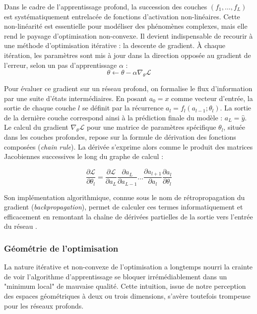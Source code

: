 Dans le cadre de l'apprentissage profond, la succession des couches $(f_1, \dots, f_L)$ est systématiquement entrelacée de fonctions d'activation non-linéaires. Cette non-linéarité est essentielle pour modéliser des phénomènes complexes, mais elle rend le paysage d'optimisation non-convexe. Il devient indispensable de recourir à une méthode d'optimisation itérative : la descente de gradient. À chaque itération, les paramètres sont mis à jour dans la direction opposée au gradient de l'erreur, selon un pas d'apprentissage $\alpha$ :
$$\theta \leftarrow \theta - \alpha \nabla_\theta \mathcal{L}$$

Pour évaluer ce gradient sur un réseau profond, on formalise le flux d'information par une suite d'états intermédiaires. En posant $a_0 = x$ comme vecteur d'entrée, la sortie de chaque couche $l$ se définit par la récurrence $a_l = f_l(a_{l-1}; \theta_l)$. La sortie de la dernière couche correspond ainsi à la prédiction finale du modèle : $a_L = \hat{y}$. \\

Le calcul du gradient $\nabla_\theta \mathcal{L}$ pour une matrice de paramètres spécifique $\theta_l$, située dans les couches profondes, repose sur la formule de dérivation des fonctions composées (\textit{chain rule}). La dérivée s'exprime alors comme le produit des matrices Jacobiennes successives le long du graphe de calcul :

$$\frac{\partial \mathcal{L}}{\partial \theta_l} = \frac{\partial \mathcal{L}}{\partial a_L} \frac{\partial a_L}{\partial a_{L-1}} \dots \frac{\partial a_{l+1}}{\partial a_l} \frac{\partial a_l}{\partial \theta_l}$$

Son implémentation algorithmique, connue sous le nom de rétropropagation du gradient (\textit{backpropagation}), permet de calculer ces termes informatiquement et efficacement en remontant la chaîne de dérivées partielles de la sortie vers l'entrée du réseau .

\subsubsection{Géométrie de l'optimisation}

La nature itérative et non-convexe de l'optimisation a longtemps nourri la crainte de voir l'algorithme d'apprentissage se bloquer irrémédiablement dans un "minimum local" de mauvaise qualité. Cette intuition, issue de notre perception des espaces géométriques à deux ou trois dimensions, s'avère toutefois trompeuse pour les réseaux profonds.\\

